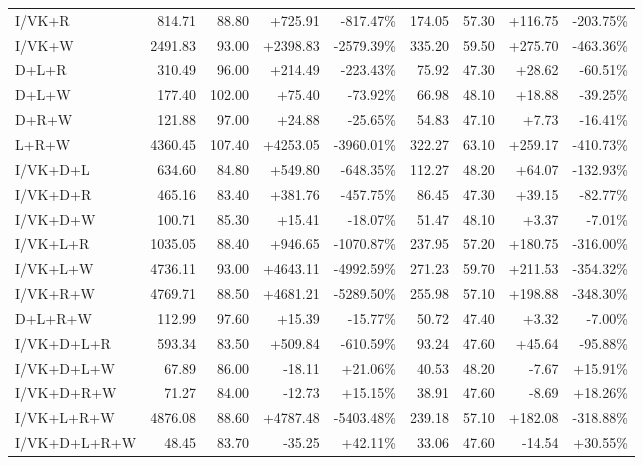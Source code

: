 \documentclass[UTF8,10pt,a4paper]{ctexart}
\newcommand{\better}[1]{\textcolor{ImpBlue}{#1}}
\newcommand{\worse}[1]{\textcolor{DropRed}{#1}}
\begin{document}
{\begin{longtable}{lrrrrrrrr}
I/VK+R & 814.71 & 88.80 & \worse{+725.91} & \worse{-817.47\%} & 174.05 & 57.30 & \worse{+116.75} & \worse{-203.75\%}\\
I/VK+W & 2491.83 & 93.00 & \worse{+2398.83} & \worse{-2579.39\%} & 335.20 & 59.50 & \worse{+275.70} & \worse{-463.36\%}\\
D+L+R & 310.49 & 96.00 & \worse{+214.49} & \worse{-223.43\%} & 75.92 & 47.30 & \worse{+28.62} & \worse{-60.51\%}\\
D+L+W & 177.40 & 102.00 & \worse{+75.40} & \worse{-73.92\%} & 66.98 & 48.10 & \worse{+18.88} & \worse{-39.25\%}\\
D+R+W & 121.88 & 97.00 & \worse{+24.88} & \worse{-25.65\%} & 54.83 & 47.10 & \worse{+7.73} & \worse{-16.41\%}\\
L+R+W & 4360.45 & 107.40 & \worse{+4253.05} & \worse{-3960.01\%} & 322.27 & 63.10 & \worse{+259.17} & \worse{-410.73\%}\\
I/VK+D+L & 634.60 & 84.80 & \worse{+549.80} & \worse{-648.35\%} & 112.27 & 48.20 & \worse{+64.07} & \worse{-132.93\%}\\
I/VK+D+R & 465.16 & 83.40 & \worse{+381.76} & \worse{-457.75\%} & 86.45 & 47.30 & \worse{+39.15} & \worse{-82.77\%}\\
I/VK+D+W & 100.71 & 85.30 & \worse{+15.41} & \worse{-18.07\%} & 51.47 & 48.10 & \worse{+3.37} & \worse{-7.01\%}\\
I/VK+L+R & 1035.05 & 88.40 & \worse{+946.65} & \worse{-1070.87\%} & 237.95 & 57.20 & \worse{+180.75} & \worse{-316.00\%}\\
I/VK+L+W & 4736.11 & 93.00 & \worse{+4643.11} & \worse{-4992.59\%} & 271.23 & 59.70 & \worse{+211.53} & \worse{-354.32\%}\\
I/VK+R+W & 4769.71 & 88.50 & \worse{+4681.21} & \worse{-5289.50\%} & 255.98 & 57.10 & \worse{+198.88} & \worse{-348.30\%}\\
D+L+R+W & 112.99 & 97.60 & \worse{+15.39} & \worse{-15.77\%} & 50.72 & 47.40 & \worse{+3.32} & \worse{-7.00\%}\\
I/VK+D+L+R & 593.34 & 83.50 & \worse{+509.84} & \worse{-610.59\%} & 93.24 & 47.60 & \worse{+45.64} & \worse{-95.88\%}\\
I/VK+D+L+W & 67.89 & 86.00 & \better{-18.11} & \better{+21.06\%} & 40.53 & 48.20 & \better{-7.67} & \better{+15.91\%}\\
I/VK+D+R+W & 71.27 & 84.00 & \better{-12.73} & \better{+15.15\%} & 38.91 & 47.60 & \better{-8.69} & \better{+18.26\%}\\
I/VK+L+R+W & 4876.08 & 88.60 & \worse{+4787.48} & \worse{-5403.48\%} & 239.18 & 57.10 & \worse{+182.08} & \worse{-318.88\%}\\
I/VK+D+L+R+W & 48.45 & 83.70 & \better{-35.25} & \better{+42.11\%} & 33.06 & 47.60 & \better{-14.54} & \better{+30.55\%}\\
\bottomrule
\end{longtable}
}
\end{document}
